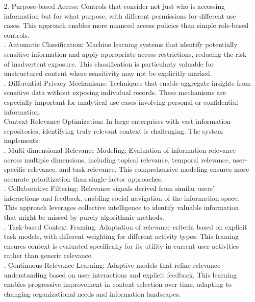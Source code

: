2. Purpose-based Access: Controls that consider not just who is accessing information but for what purpose, with different permissions for different use cases. This approach enables more nuanced access policies than simple role-based controls.\\ . Automatic Classification: Machine learning systems that identify potentially sensitive information and apply appropriate access restrictions, reducing the risk of inadvertent exposure. This classification is particularly valuable for unstructured content where sensitivity may not be explicitly marked.\\ . Differential Privacy Mechanisms: Techniques that enable aggregate insights from sensitive data without exposing individual records. These mechanisms are especially important for analytical use cases involving personal or confidential information.\\ \newline
Context Relevance Optimization: In large enterprises with vast information repositories, identifying truly relevant context is challenging. The system implements:\\ . Multi-dimensional Relevance Modeling: Evaluation of information relevance across multiple dimensions, including topical relevance, temporal relevance, user-specific relevance, and task relevance. This comprehensive modeling ensures more accurate prioritization than single-factor approaches.\\ . Collaborative Filtering: Relevance signals derived from similar users' interactions and feedback, enabling social navigation of the information space. This approach leverages collective intelligence to identify valuable information that might be missed by purely algorithmic methods.\\ . Task-based Context Framing: Adaptation of relevance criteria based on explicit task models, with different weighting for different activity types. This framing ensures context is evaluated specifically for its utility in current user activities rather than generic relevance.\\ . Continuous Relevance Learning: Adaptive models that refine relevance understanding based on user interactions and explicit feedback. This learning enables progressive improvement in context selection over time, adapting to changing organizational needs and information landscapes.\\
